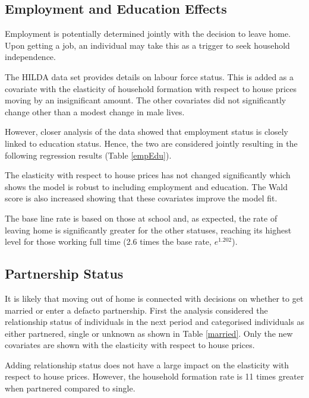 \documentclass[12pt]{article}
\begin{document}


\subsection{Employment and Education Effects}

Employment is potentially determined jointly with the decision to leave home. Upon getting a job, an individual may take this as a trigger to seek household independence.

The HILDA data set provides details on labour force status. This is added as a covariate with the elasticity of household formation with respect to house prices moving by an insignificant amount. The other covariates did not significantly change other than a modest change in male lives.

However, closer analysis of the data showed that employment status is closely linked to education status. Hence, the two are considered jointly resulting in the following regression results (Table \ref{empEdu}).



The elasticity with respect to house prices has not changed significantly which shows the model is robust to including employment and education. The Wald score is also increased showing that these covariates improve the model fit.

The base line rate is based on those at school and, as expected, the rate of leaving home is significantly greater for the other statuses, reaching its highest level for those working full time (2.6 times the base rate, $e^{1.202}$).

\subsection{Partnership Status}
It is likely that moving out of home is connected with decisions on whether to get married or enter a defacto partnership. First the analysis considered the relationship status of individuals in the next period and categorised individuals as either partnered, single or unknown as shown in Table \ref{married}. Only the new covariates are shown with the elasticity with respect to house prices.



Adding relationship status does not have a large impact on the elasticity with respect to house prices. However, the household formation rate is 11 times greater when partnered compared to single.
\end{document}
